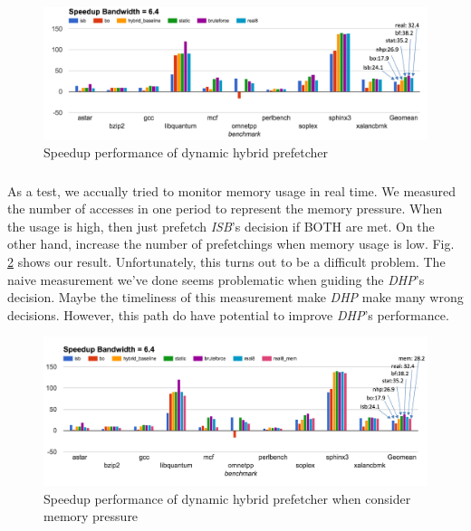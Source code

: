 \begin{figure}[ht!]
   \centering
   \includegraphics[width=1.0\textwidth]{images/final_speedup.png}
   \caption{Speedup performance of dynamic hybrid prefetcher}
   \label{fig:final_speedup}
\end{figure}

\subsubsection*{}
\subsubsection*{}
As a test, we accually tried to monitor memory usage in real time. We measured the number of accesses in one period to represent the memory pressure. When the usage is high, then just prefetch \emph{ISB}'s decision if BOTH are met. On the other hand, increase the number of prefetchings when memory usage is low. Fig. \ref{fig:final_speedup_mem} shows our result. Unfortunately, this turns out to be a difficult problem. The naive measurement we've done seems problematic when guiding the \emph{DHP}'s decision. Maybe the timeliness of this measurement make \emph{DHP} make many wrong decisions. However, this path do have potential to improve \emph{DHP}'s performance.

\begin{figure}[ht!]
   \centering
   \includegraphics[width=1.0\textwidth]{images/final_speedup_mem.png}
   \caption{Speedup performance of dynamic hybrid prefetcher when consider memory pressure}
   \label{fig:final_speedup_mem}
\end{figure}
